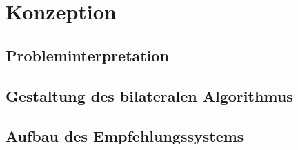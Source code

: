 
\chapter{Konzeption}
\label{ch:algorithmus}

\section{Probleminterpretation}

\section{Gestaltung des bilateralen Algorithmus}

\section{Aufbau des Empfehlungssystems}


